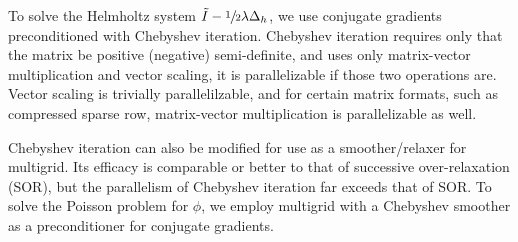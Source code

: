To solve the Helmholtz system $\tilde{I}-\sfrac12\lambda\Delta_h$, we use
conjugate gradients preconditioned with Chebyshev iteration. Chebyshev
iteration requires only that the matrix be positive (negative) semi-definite,
and uses only matrix-vector multiplication and vector scaling, it is
parallelizable if those two operations are. Vector scaling is trivially
parallelilzable, and for certain matrix formats, such as compressed sparse row,
matrix-vector multiplication is parallelizable as well.

Chebyshev iteration can also be modified for use as a smoother/relaxer for
multigrid. Its efficacy is comparable or better to that of successive
over-relaxation (SOR), but the parallelism of Chebyshev iteration far exceeds
that of SOR. To solve the Poisson problem for $\phi$, we employ multigrid with
a Chebyshev smoother as a preconditioner for conjugate gradients.

